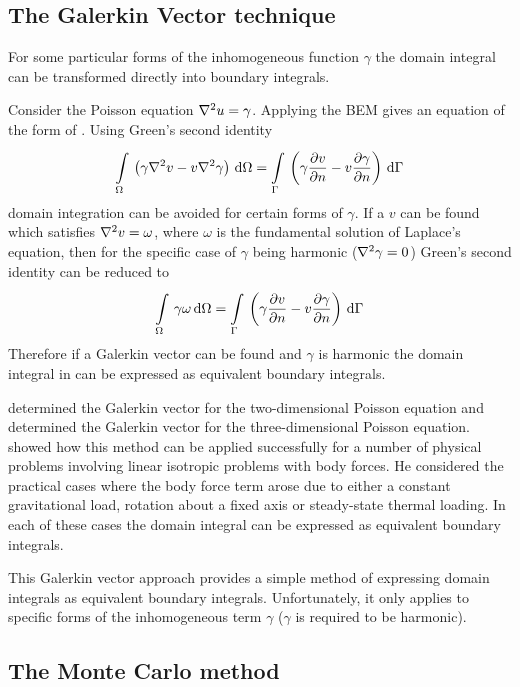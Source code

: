 \subsection{The Galerkin Vector technique}

For some particular forms of the inhomogeneous function $\gamma$ the domain
integral can be transformed directly into boundary integrals. 

Consider the Poisson equation $\laplacian{}{u} = \gamma$.  Applying the BEM gives
an equation of the form of .  Using Green's second
identity
\begin{equation}
  \goneint{\pbrac{\gamma \laplacian{}{v} - v
  \laplacian{}{\gamma}}}{\Omega} = 
  \goneint{\pbrac{\gamma \delby{v}{n} - v \delby{\gamma}{n}}}{\Gamma}
\end{equation}
domain integration can be avoided for certain forms of $\gamma$.  If a
 $v$ can be found which satisfies $\laplacian{}{v} = \omega$,
where $\omega$ is the fundamental solution of Laplace's equation, then for
the specific case of $\gamma$ being harmonic ($\laplacian{}{\gamma} = 0$) Green's
second identity can be reduced to
\begin{equation}
  \goneint{\gamma \omega}{\Omega} = \goneint{\pbrac{\gamma \delby{v}{n} - v
      \delby{\gamma}{n}}}{\Gamma} 
\end{equation}
Therefore if a Galerkin vector can be found and $\gamma$ is harmonic the
domain integral in  can be expressed as equivalent
boundary integrals.

\citet{fairweather:1979} determined the Galerkin vector for the
two-dimensional Poisson equation and \citet{rangogni:1982} determined
the Galerkin vector for the three-dimensional Poisson equation.
\citet{danson:1981} showed how this method can be applied
successfully for a number of physical problems involving linear isotropic
problems with body forces.  He considered the practical cases where the
body force term arose due to either a constant gravitational load, rotation
about a fixed axis or steady-state thermal loading.  In each of these cases
the domain integral can be expressed as equivalent boundary integrals.

This Galerkin vector approach provides a simple method of expressing 
domain integrals as equivalent boundary integrals.  Unfortunately, it only
applies to specific forms of the inhomogeneous term $\gamma$ (\ie $\gamma$
is required to be harmonic).

\subsection{The Monte Carlo method}

